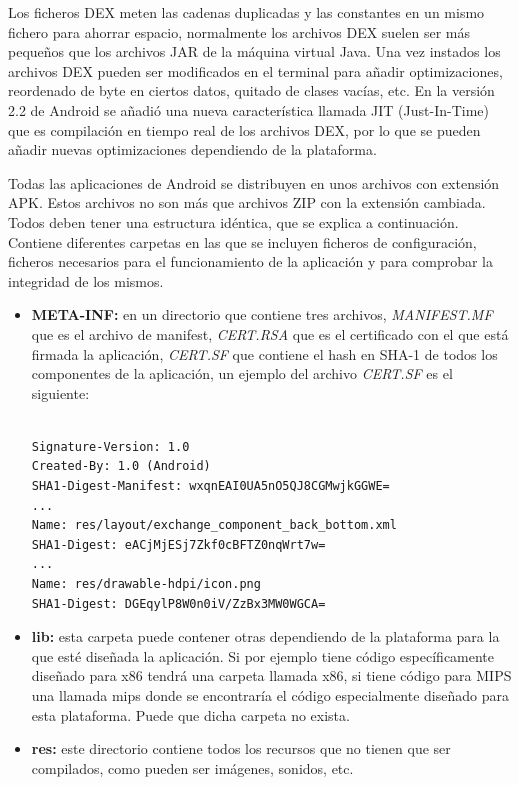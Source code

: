Los ficheros DEX meten las cadenas duplicadas y las constantes en un mismo fichero para ahorrar espacio, normalmente los archivos DEX suelen ser más pequeños que los archivos JAR de la máquina virtual Java. Una vez instados los archivos DEX pueden ser modificados en el terminal para añadir optimizaciones, reordenado de byte en ciertos datos, quitado de clases vacías, etc. En la versión 2.2 de Android se añadió una nueva característica llamada JIT (Just-In-Time) que es compilación en tiempo real de los archivos DEX, por lo que se pueden añadir nuevas optimizaciones dependiendo de la plataforma.

Todas las aplicaciones de Android se distribuyen en unos archivos con extensión APK. Estos archivos no son más que archivos ZIP con la extensión cambiada. Todos deben tener una estructura idéntica, que se explica a continuación. Contiene diferentes carpetas en las que se incluyen ficheros de configuración, ficheros necesarios para el funcionamiento de la aplicación y para comprobar la integridad de los mismos.

\begin{itemize}

\item \textbf{META-INF:} en un directorio que contiene tres archivos, \textit{MANIFEST.MF} que es el archivo de manifest, \textit{CERT.RSA} que es el certificado con el que está firmada la aplicación, \textit{CERT.SF} que contiene el hash en SHA-1 de todos los componentes de la aplicación, un ejemplo del archivo \textit{CERT.SF} es el siguiente:

\begin{verbatim}

Signature-Version: 1.0
Created-By: 1.0 (Android)
SHA1-Digest-Manifest: wxqnEAI0UA5nO5QJ8CGMwjkGGWE=
...
Name: res/layout/exchange_component_back_bottom.xml
SHA1-Digest: eACjMjESj7Zkf0cBFTZ0nqWrt7w=
...
Name: res/drawable-hdpi/icon.png
SHA1-Digest: DGEqylP8W0n0iV/ZzBx3MW0WGCA=
\end{verbatim}

\item \textbf{lib:} esta carpeta puede contener otras dependiendo de la plataforma para la que esté diseñada la aplicación. Si por ejemplo tiene código específicamente diseñado para x86 tendrá una carpeta llamada x86, si tiene código para MIPS una llamada mips donde se encontraría el código especialmente diseñado para esta plataforma. Puede que dicha carpeta no exista.

\item \textbf{res:} este directorio contiene todos los recursos que no tienen que ser compilados, como pueden ser imágenes, sonidos, etc.

\end{itemize}

